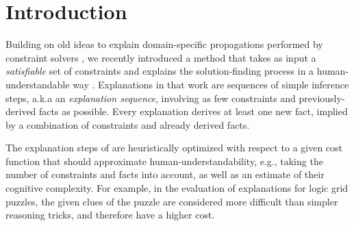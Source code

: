 \documentclass{llncs}
\begin{document}
\begin{abstract}
\end{abstract}
%
%
%
\section{Introduction}
Building on old ideas to explain domain-specific propagations performed by constraint solvers \cite{sqalli1996inference,freuder2001explanation}, we recently introduced a method that takes as input a \emph{satisfiable} set of constraints
and explains the solution-finding process in a human-understandable way \cite{ecai/BogaertsGCG20}. 
Explanations in that work are sequences of simple inference steps, a.k.a an \emph{explanation sequence}, involving as few constraints and previously-derived facts as possible. Every explanation derives at least one new fact, implied by a combination of constraints and already derived facts.

The explanation steps of \cite{ecai/BogaertsGCG20} are heuristically optimized with respect to a given cost function that should approximate human-understandability, e.g., taking the number of constraints and facts into account, as well as an estimate of their cognitive complexity.
For example, in the evaluation of explanations for logic grid puzzles, the given clues of the puzzle are considered more difficult than simpler reasoning tricks, and therefore have a higher cost.
\end{document}
